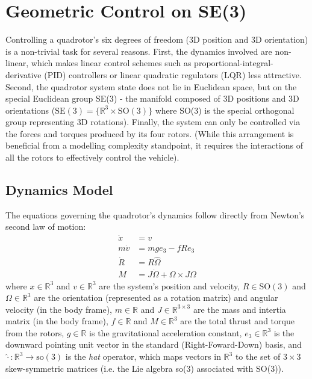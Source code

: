\documentclass[paper=letter, fontsize=11pt]{scrartcl} %
\numberwithin{equation}{section} %
\numberwithin{figure}{section} %
\numberwithin{table}{section} %
\begin{document}
\section{Geometric Control on SE(3)}
Controlling a quadrotor's six degrees of freedom (3D position and 3D orientation) is a
non-trivial task for several reasons. First, the dynamics involved are non-linear, which
makes linear control schemes  such as proportional-integral-derivative (PID) controllers or
linear quadratic regulators (LQR) less attractive. Second, the quadrotor system state
does not lie in Euclidean space, but on the special Euclidean group SE(3) - the manifold composed
of 3D positions and 3D orientations ($\textrm{SE}(3) = \{\mathbb{R}^3 \times \textrm{SO}(3)\}$
where SO(3) is the special orthogonal group representing 3D rotations).
Finally, the system can only be controlled via the forces and torques produced by its
four rotors. (While this arrangement is beneficial from a modelling complexity standpoint,
it requires the interactions of all the rotors to effectively control the vehicle).

\subsection{Dynamics Model}
The equations governing the quadrotor's dynamics follow directly from Newton's second law
of motion:
\begin{align}
\dot{x} &= v \\
m \dot{v} &= m g e_3 - f R e_3 \\
\dot{R} &= R \hat{\Omega} \\
M &= J \dot{\Omega} + \Omega \times J\Omega
\end{align}
where $x \in \mathbb{R}^3$ and $v \in \mathbb{R}^3$ are the system's position and velocity,
$R \in \textrm{SO}(3)$ and $\Omega \in \mathbb{R}^3$
are the orientation (represented as a rotation matrix) and angular velocity (in the
body frame), $m \in \mathbb{R}$ and $J \in \mathbb{R}^{3 \times 3}$ are the mass
and intertia matrix (in the body frame), $f \in \mathbb{R}$ and $M \in \mathbb{R}^3$ are the
total thrust and torque from the rotors, $g \in \mathbb{R}$
is the gravitational acceleration constant, $e_3 \in \mathbb{R}^3$ is the downward pointing unit vector
in the standard (Right-Foward-Down) basis, and $\hat{\cdot}: \mathbb{R}^3 \rightarrow \textrm{so}(3)$
is the \textit{hat} operator, which maps vectors in $\mathbb{R}^3$ to the set of $3 \times 3$
skew-symmetric matrices (i.e. the Lie algebra so(3) associated with SO(3)).
\end{document}
